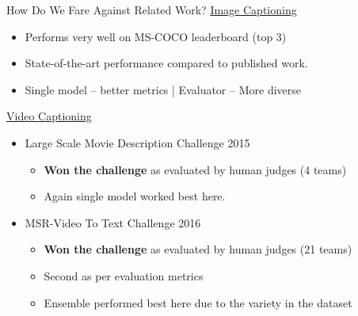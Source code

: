 \documentclass{beamer}
\newcommand{\mct}[1]{\multicolumn{2}{c|}{\bf#1}}
\begin{document}
\begin{frame}{How Do We Fare Against Related Work?}
\underline{Image Captioning}
\begin{itemize}
	\item Performs very well on MS-COCO leaderboard (top 3)
	\item State-of-the-art performance compared to published work.
	\item Single model -- better metrics |  Evaluator -- More diverse 
\end{itemize}
\underline{Video Captioning}
\begin{itemize}
	\item Large Scale Movie Description Challenge 2015
		\begin{itemize}
			\item \textbf{Won the challenge} as evaluated by human judges (4 teams)
			\item Again single model worked best here.
		\end{itemize}
	\item MSR-Video To Text Challenge 2016
		\begin{itemize}
			\item \textbf{Won the challenge} as evaluated by human judges (21 teams)
			\item Second as per evaluation metrics
			\item Ensemble performed best here due to the variety in the dataset
		\end{itemize}

\end{itemize}
\end{frame}
\end{document}
